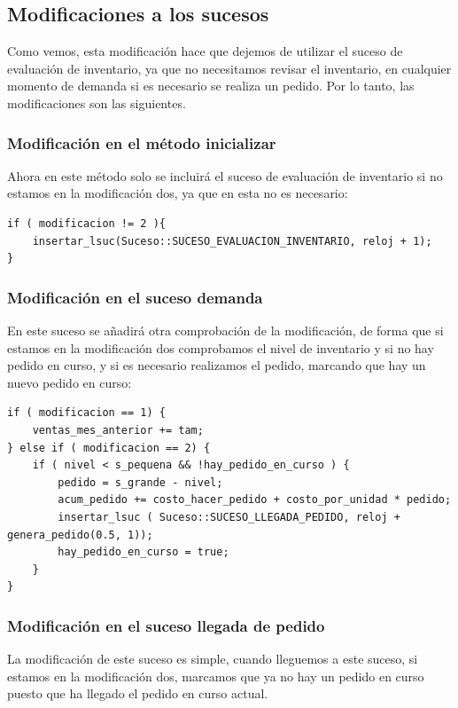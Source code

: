 \documentclass[12pt, spanish]{article}
\begin{document}
\subsection{Modificaciones a los sucesos}

Como vemos, esta modificación hace que dejemos de utilizar el suceso de evaluación de inventario, ya que no necesitamos revisar el inventario, en cualquier momento de demanda si es necesario se realiza un pedido. Por lo tanto, las modificaciones son las siguientes.

\subsubsection{Modificación en el método inicializar}

Ahora en este método solo se incluirá el suceso de evaluación de inventario si no estamos en la modificación dos, ya que en esta no es necesario:

\begin{lstlisting}
if ( modificacion != 2 ){
	insertar_lsuc(Suceso::SUCESO_EVALUACION_INVENTARIO, reloj + 1);
}
\end{lstlisting}

\subsubsection{Modificación en el suceso demanda}

En este suceso se añadirá otra comprobación de la modificación, de forma que si estamos en la modificación dos comprobamos el nivel de inventario y si no hay pedido en curso, y si es necesario realizamos el pedido, marcando que hay un nuevo pedido en curso:


\begin{lstlisting}
if ( modificacion == 1) {
	ventas_mes_anterior += tam;
} else if ( modificacion == 2) {
	if ( nivel < s_pequena && !hay_pedido_en_curso ) {
		pedido = s_grande - nivel;
		acum_pedido += costo_hacer_pedido + costo_por_unidad * pedido;
		insertar_lsuc ( Suceso::SUCESO_LLEGADA_PEDIDO, reloj + genera_pedido(0.5, 1));
		hay_pedido_en_curso = true;
	}
}
\end{lstlisting}


\subsubsection{Modificación en el suceso llegada de pedido}

La modificación de este suceso es simple, cuando lleguemos a este suceso, si estamos en la modificación dos, marcamos que ya no hay un pedido en curso puesto que ha llegado el pedido en curso actual.
\end{document}
